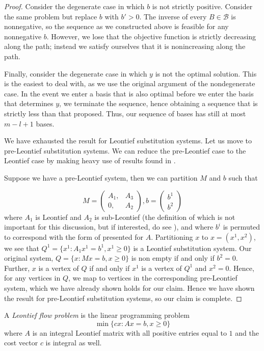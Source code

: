 \documentclass[11pt,a4paper]{article}
\theoremstyle{definition}
\begin{document}
\begin{proof}
Consider the degenerate case in which $b$ is not strictly positive. Consider the same problem but replace $b$ with $b'>0$. The inverse of every $B\in \mathcal{B}$ is nonnegative, so the sequence as we constructed above is feasible for any nonnegative $b$. However, we lose that the objective function is strictly decreasing along the path; instead we satisfy ourselves that it is nonincreasing along the path.

Finally, consider the degenerate case in which $y$ is not the optimal solution. This is the easiest to deal with, as we use the original argument of the nondegenerate case. In the event we enter a basis that is also optimal before we enter the basis that determines $y$, we terminate the sequence, hence obtaining a sequence that is strictly less than that proposed. Thus, our sequence of bases has still at most $m-l+1$ bases.

We have exhausted the result for Leontief substitution systems. Let us move to pre-Leontief substitution systems. We can reduce the pre-Leontief case to the Leontief case by making heavy use of results found in \citet{vein68}.

Suppose we have a pre-Leontief system, then we can partition $M$ and $b$ such that

$$M=
\left(
\begin{array}{cc}
	A_1, & A_3\\
	0, & A_2
\end{array}
\right),
b=
\left(
\begin{array}{c}
b^1\\
b^2
\end{array}
\right)
$$
where $A_1$ is Leontief and $A_2$ is sub-Leontief (the definition of which is not important for this discussion, but if interested, do see \citep{vein68}), and where $b^i$ is permuted to correspond with the form of presented for $A$. Partitioning $x$ to $x=(x^1,x^2)$, we see that $Q^1=\{x^1: A_1 x^1 =b^1, x^1\ge 0\}$ is a Leontief substitution system. Our original system, $Q=\{x: Mx=b,x\ge 0\}$ is non empty if and only if $b^2=0$. Further, $x$ is a vertex of $Q$ if and only if $x^1$ is a vertex of $Q^1$ and $x^2=0$. Hence, for any vertices in $Q$, we map to vertices in the corresponding pre-Leontief system, which we have already shown holds for our claim. Hence we have shown the result for pre-Leontief substitution systems, so our claim is complete.
\end{proof}

A \emph{Leontief flow problem} is the linear programming problem
$$\min\{ cx : Ax=b, x\ge 0\}$$
where $A$ is an integral Leontief matrix with all positive entries equal to $1$ and the cost vector $c$ is integral as well.
\end{document}
